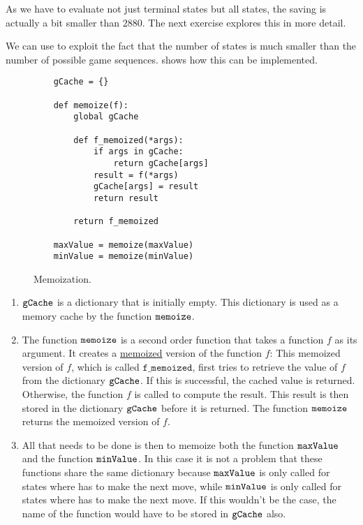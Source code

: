 As we have to evaluate not just terminal states but all states, the saving is actually a bit smaller than
$2880$.  The next exercise explores this in more detail.

We can use   to exploit the fact that the number of states is much smaller
than the number of possible game sequences. 
 shows how this can be implemented.

\begin{figure}[!ht]
\centering
\begin{verbatim}
    gCache = {}

    def memoize(f):
        global gCache

        def f_memoized(*args):
            if args in gCache:
                return gCache[args]
            result = f(*args)
            gCache[args] = result
            return result

        return f_memoized
  
    maxValue = memoize(maxValue)
    minValue = memoize(minValue)
\end{verbatim}
\caption{Memoization.}
\label{fig:Minimax.ipynb-mem}
\end{figure}
\FloatBarrier

\begin{enumerate}
\item $\texttt{gCache}$ is a dictionary that is initially empty.  This dictionary is used as a memory cache by 
      the function $\texttt{memoize}$.
\item The function $\texttt{memoize}$ is a second order function that takes a function $f$ as its argument.
      It creates a \href{https://en.wikipedia.org/wiki/Memoization}{memoized} version of the function $f$:
      This memoized version of $f$, which is called $\mathtt{f\_memoized}$, first tries to retrieve the value
      of $f$ from the dictionary $\texttt{gCache}$. 
      If this is successful, the cached value is returned.  Otherwise, the function $f$ is called
      to compute the result.  This result is then stored in the dictionary $\texttt{gCache}$ before it is returned.
      The function $\texttt{memoize}$ returns the memoized version of $f$.
\item All that needs to be done is then to memoize both the function $\texttt{maxValue}$ and the function
      $\texttt{minValue}$.  In this case it is not a problem that these functions share the same dictionary
       because  $\texttt{maxValue}$ is only called for states where  has to make the
      next move, while  $\texttt{minValue}$ is only called for states where  has to make the
      next move.  If this wouldn't be the case, the name of the function would have to be stored in
      $\texttt{gCache}$ also.

\end{enumerate}

